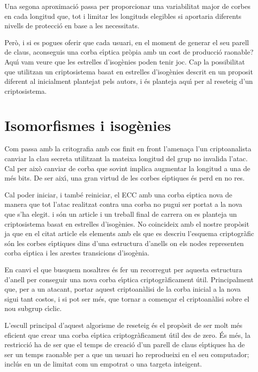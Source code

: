\documentclass[12pt,twoside,catalan,a4paper]{book}%
\numberwithin{figure}{section}		%
\theoremstyle{definition}   			%
\def\ce{corba e\lgem{}\'{\i}ptica}%
\def\ces{corbes e\lgem{}\'{\i}ptiques}%
\def\cf{cos finit}%
\def\sgc{subgrup c\'{\i}clic}%
\theoremstyle{saltolinea}   			%
\begin{document}
Una segona aproximaci\'o passa per proporcionar una variabilitat major de corbes en cada longitud que, tot i limitar les longituds elegibles si aportaria diferents nivells de protecci\'o en base a les necessitats.

Per\`o, i si es pogues oferir que cada usuari, en el moment de generar el seu parell de claus, aconseguis una \ce{} pr\`opia amb un cost de producci\'o raonable? Aqu\'{\i} vam veure que les estrelles d'isog\`enies poden tenir joc. Cap la possibilitat que utilitzan un criptosistema basat en estrelles d'isog\`enies descrit en \cite{PkIso} un proposit diferent al inicialment plantejat pels autors, i \'es planteja aqu\'{\i} per al reseteig d'un criptosistema.

\section{Isomorfismes i isog\`enies}

Com passa amb la critografia amb \cf{} en front l'amena\c{c}a l'un criptoanalista canviar la clau secreta utilitzant la mateixa longitud del grup no invalida l'atac. Cal per aix\`o canviar de corba que sovint implica augmentar la longitud a una de m\'es bits. De ser aix\'{\i}, una gran virtud de les \ces{} \'es perd en no res.

Cal poder iniciar, i tamb\'e reiniciar, el ECC amb una \ce{} nova de manera que tot l'atac realitzat contra una corba no pugui ser portat a la nova que s'ha elegit. \cite{PkIso} i \cite{isoTFC} s\'on un article i un treball final de carrera on es planteja un criptosistema basat en estrelles d'isog\`enies. No coincideix amb el nostre prop\`osit ja que en el citat article els elements amb els que es descriu l'esquema criptogr\`afic s\'on les \ces{} dins d'una estructura d'anells on els nodes representen \ce{} i les arestes transicions d'isog\`enia.

En canvi el que busquem nosaltres \'es fer un recorregut per aquesta estructura d'anell per conseguir una nova \ce{} criptogr\`aficament \'util. Principalment que, per a un atacant, portar aquest criptoan\`alisi de la corba inicial a la nova sigui tant costos, i si pot ser m\'es, que tornar a comen\c{c}ar el criptoan\`alisi sobre el nou \sgc{}.

L'escull principal d'aquest algorisme de reseteig \'es el prop\`osit de ser molt m\'es eficient que crear una \ce{} criptogr\`aficament \'util des de zero. \'Es m\'es, la restricci\'o ha de ser que el temps de creaci\'o d'un parell de claus e\lgem{}\'{\i}ptiques ha de ser un temps raonable per a que un usuari ho reprodueixi en el seu computador; incl\'us en un de limitat com un empotrat o una targeta inte\lgem{}igent.
\end{document}
